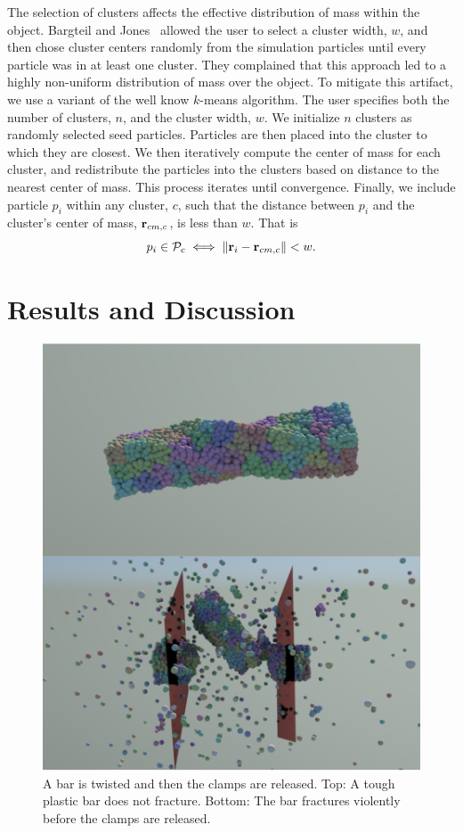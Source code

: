 \documentclass[review]{acmsiggraph}
\begin{document}
The selection of clusters affects the effective distribution of mass 
within the object.  Bargteil and Jones~
allowed the user to select a cluster width, $w$, and then
chose cluster centers randomly from the simulation particles until every particle
was in at least one cluster.  They complained that this approach led
to a highly non-uniform distribution of mass over the object.  
To mitigate this artifact, we use a variant of the
well know $k$-means algorithm.  The user specifies both the
number of clusters, $n$, and the cluster width, $w$.
We initialize $n$ clusters as randomly selected seed particles.
Particles are then placed into the cluster to which they are closest.
We then iteratively compute the center of mass for each cluster, and
redistribute the particles into the clusters based on distance to the
nearest center of mass.  This process iterates until 
convergence.  Finally, we include particle $p_i$ within any cluster, $c$,
such that the distance between $p_i$ and the cluster's center
of mass, $\mathit{\mathbf{r}}_{cm,c}$, is less than $w$.  That is
\begin{equation}
p_i\in\mathcal{P}_c \iff \|\mathit{\mathbf{r}}_i-\mathit{\mathbf{r}}_{cm,c}\| < w.
\end{equation}


\section{Results and Discussion}
\begin{figure}
\includegraphics[width=\linewidth]{Figures/twistingBarComp}
\caption{A bar is twisted and then the clamps are released.  Top: A tough plastic bar does not fracture.  Bottom: The bar fractures violently before the clamps are released.}
\label{fig:twistedbar}
\end{figure}
\end{document}
